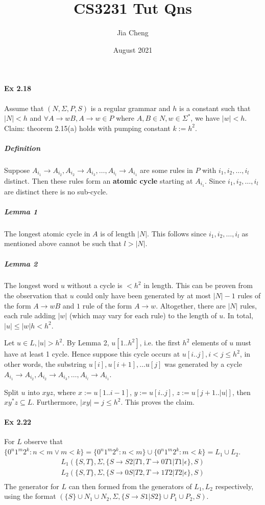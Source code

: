 \documentclass{article}
\title{CS3231 Tut Qns}
\author{Jia Cheng}
\date{August 2021}
\begin{document}
\maketitle

\paragraph{Ex 2.18} Assume that $(N, \Sigma, P, S)$ is a regular grammar and $h$ is a constant such that $|N|<h$ and $\forall A\rightarrow wB, A\rightarrow w\in P$ where $A,B\in N, w\in \Sigma^*$, we have $|w|<h$. Claim: theorem 2.15(a) holds with pumping constant $k:=h^2$.

\subparagraph{Definition} Suppose $A_{i_1}\rightarrow A_{i_2}, A_{i_2}\rightarrow A_{i_3},\dots, A_{i_l}\rightarrow A_{i_1}$ are some rules in $P$ with $i_1, i_2, \dots, i_l$ distinct. Then these rules form an \textbf{atomic cycle} starting at $A_{i_1}$. Since $i_1, i_2, \dots, i_l$ are distinct there is no sub-cycle.

\subparagraph{Lemma 1} The longest atomic cycle in $A$ is of length $|N|$. This follows since $i_1, i_2, \dots, i_l$ as mentioned above cannot be such that $l > |N|$.

\subparagraph{Lemma 2} The longest word $u$ without a cycle is $<h^2$ in length. This can be proven from the observation that $u$ could only have been generated by at most $|N|-1$ rules of the form $A\rightarrow wB$ and $1$ rule of the form $A\rightarrow w$. Altogether, there are $|N|$ rules, each rule adding $|w|$ (which may vary for each rule) to the length of $u$. In total, $|u|\leq |w|h< h^2$.

Let $u\in L, |u|>h^2$. By Lemma 2, $u[1..h^2]$, i.e. the first $h^2$ elements of $u$ must have at least 1 cycle. Hence suppose this cycle occurs at $u[i..j], i < j\leq h^2$, in other words, the substring $u[i], u[i+1],\dots u[j]$ was generated by a cycle $A_{i_1}\rightarrow A_{i_2}, A_{i_2}\rightarrow A_{i_3},\dots, A_{i_l}\rightarrow A_{i_1}$.

Split $u$ into $xyz$, where $x:=u[1..i-1]$, $y:=u[i..j]$, $z:=u[j+1..|u|]$, then $xy^*z\subseteq L$. Furthermore, $|xy|=j\leq h^2$. This proves the claim.

\paragraph{Ex 2.22}\mbox{}

For $L$ observe that $\{0^n1^m2^k:n<m \lor m<k\} = \{0^n1^m2^k:n<m\}\cup \{0^n1^m2^k:m<k\} = L_1\cup L_2$.
\begin{align*}
	L_1 (\{S,T\}, \Sigma, \{S\rightarrow S2|T1, T\rightarrow 0T1|T1|\epsilon\}, S)\\
	L_2 (\{S,T\}, \Sigma, \{S\rightarrow 0S|T2, T\rightarrow 1T2|T2|\epsilon \}, S)\\
\end{align*}
The generator for $L$ can then formed from the generators of $L_1,L_2$ respectively, using the format $(\{S\}\cup N_1\cup N_2, \Sigma, \{S\rightarrow S1|S2\}\cup P_1\cup P_2, S)$.
\end{document}
